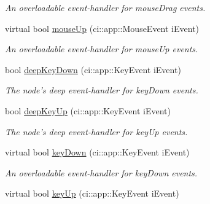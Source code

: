 \begin{DoxyCompactItemize}
\begin{DoxyCompactList}\small\item\em An overloadable event-\/handler for mouse\-Drag events. \end{DoxyCompactList}\item 
\hypertarget{class_gui_base_a4b117a85faac9c1ad05232cc26cc72b2}{virtual bool \hyperlink{class_gui_base_a4b117a85faac9c1ad05232cc26cc72b2}{mouse\-Up} (ci\-::app\-::\-Mouse\-Event i\-Event)}\label{class_gui_base_a4b117a85faac9c1ad05232cc26cc72b2}

\begin{DoxyCompactList}\small\item\em An overloadable event-\/handler for mouse\-Up events. \end{DoxyCompactList}\item 
\hypertarget{class_gui_base_a5b208c23add4471fe5a84ad9b72dec88}{bool \hyperlink{class_gui_base_a5b208c23add4471fe5a84ad9b72dec88}{deep\-Key\-Down} (ci\-::app\-::\-Key\-Event i\-Event)}\label{class_gui_base_a5b208c23add4471fe5a84ad9b72dec88}

\begin{DoxyCompactList}\small\item\em The node's deep event-\/handler for key\-Down events. \end{DoxyCompactList}\item 
\hypertarget{class_gui_base_a3497b3630f38a9235038e725a0ed516d}{bool \hyperlink{class_gui_base_a3497b3630f38a9235038e725a0ed516d}{deep\-Key\-Up} (ci\-::app\-::\-Key\-Event i\-Event)}\label{class_gui_base_a3497b3630f38a9235038e725a0ed516d}

\begin{DoxyCompactList}\small\item\em The node's deep event-\/handler for key\-Up events. \end{DoxyCompactList}\item 
\hypertarget{class_gui_base_aff89c3ffda887abb5ccce31ba5c07425}{virtual bool \hyperlink{class_gui_base_aff89c3ffda887abb5ccce31ba5c07425}{key\-Down} (ci\-::app\-::\-Key\-Event i\-Event)}\label{class_gui_base_aff89c3ffda887abb5ccce31ba5c07425}

\begin{DoxyCompactList}\small\item\em An overloadable event-\/handler for key\-Down events. \end{DoxyCompactList}\item 
\hypertarget{class_gui_base_a5ef639091768571edc0c08a1c8544ded}{virtual bool \hyperlink{class_gui_base_a5ef639091768571edc0c08a1c8544ded}{key\-Up} (ci\-::app\-::\-Key\-Event i\-Event)}\label{class_gui_base_a5ef639091768571edc0c08a1c8544ded}


\end{DoxyCompactItemize}

